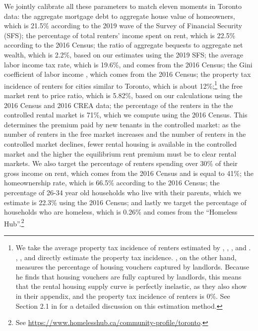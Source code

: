 \documentclass[parskip=full]{article}
\begin{document}
We jointly calibrate all these parameters to match eleven moments in Toronto data: the aggregate mortgage debt to aggregate house value of homeowners, which is 21.5\% according to the 2019 wave of the Survey of Financial Security (SFS); the percentage of total renters' income spent on rent, which is 22.5\% according to the 2016 Census; the ratio of aggregate bequests to aggregate net wealth, which is 2.2\%, based on our estimates using the 2019 SFS; the average labor income tax rate, which is 19.6\%, and comes from the 2016 Census; the Gini coefficient of labor income , which comes from the 2016 Census; the property tax incidence of renters for cities similar to Toronto, which is about 12\%;\footnote{We take the average property tax incidence of renters estimated by \citet{cy-1994}, \citet{susin-2002}, \citet{fack-2006}, and \citet{sy-2020}. \citet{cy-1994}, \citet{fack-2006}, and \citet{sy-2020} directly estimate the property tax incidence. \citet{susin-2002}, on the other hand, measures the percentage of housing vouchers captured by landlords. Because he finds that housing vouchers are fully captured by landlords, this means that the rental housing supply curve is perfectly inelastic, as they also show in their appendix, and the property tax incidence of renters is 0\%. See Section 2.1 in \citet{rs-2023} for a detailed discussion on this estimation method.} the free market rent to price ratio, which is 5.82\%, based on our calculations using the 2016 Census and 2016 CREA data; the percentage of the renters in the the controlled rental market is 71\%, which we compute using the 2016 Census. This determines the premium paid by new tenants in the controlled market: as the number of renters in the free market increases and the number of renters in the controlled market declines, fewer rental housing is available in the controlled market and the higher the equilibrium rent premium must be to clear rental markets. We also target the percentage of renters spending over 30\% of their gross income on rent, which comes from the 2016 Census and is equal to 41\%; the homeownership rate, which is 66.5\% according to the 2016 Census; the percentage of 26-34 year old households who live with their parents, which we estimate is 22.3\% using the 2016 Census; and lastly we target the percentage of households who are homeless, which is 0.26\% and comes from the ``Homeless Hub''.\footnote{See \url{https://www.homelesshub.ca/community-profile/toronto}.}
\end{document}
